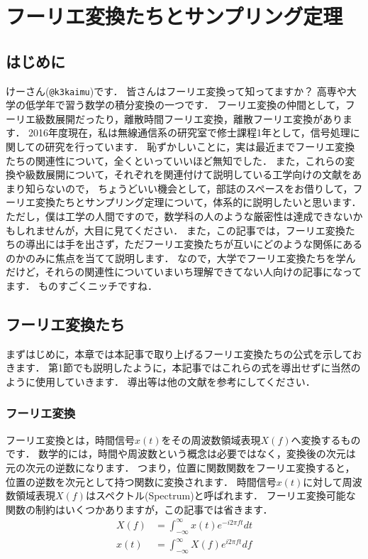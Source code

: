 
\chapter{フーリエ変換たちとサンプリング定理}

\section{はじめに}

けーさん(\verb|@k3kaimu|)です．
皆さんはフーリエ変換って知ってますか？
高専や大学の低学年で習う数学の積分変換の一つです．
フーリエ変換の仲間として，フーリエ級数展開だったり，離散時間フーリエ変換，離散フーリエ変換があります．
2016年度現在，私は無線通信系の研究室で修士課程1年として，信号処理に関しての研究を行っています．
恥ずかしいことに，実は最近までフーリエ変換たちの関連性について，全くといっていいほど無知でした．
また，これらの変換や級数展開について，それぞれを関連付けて説明している工学向けの文献をあまり知らないので，
ちょうどいい機会として，部誌のスペースをお借りして，フーリエ変換たちとサンプリング定理について，体系的に説明したいと思います．
ただし，僕は工学の人間ですので，数学科の人のような厳密性は達成できないかもしれませんが，大目に見てください．
また，この記事では，フーリエ変換たちの導出には手を出さず，ただフーリエ変換たちが互いにどのような関係にあるのかのみに焦点を当てて説明します．
なので，大学でフーリエ変換たちを学んだけど，それらの関連性についていまいち理解できてない人向けの記事になってます．
ものすごくニッチですね．

\section{フーリエ変換たち}

まずはじめに，本章では本記事で取り上げるフーリエ変換たちの公式を示しておきます．
第1節でも説明したように，本記事ではこれらの式を導出せずに当然のように使用していきます．
導出等は他の文献を参考にしてください．

\subsection{フーリエ変換}

フーリエ変換とは，時間信号$x(t)$をその周波数領域表現$X(f)$へ変換するものです．
数学的には，時間や周波数という概念は必要ではなく，変換後の次元は元の次元の逆数になります．
つまり，位置に関数関数をフーリエ変換すると，位置の逆数を次元として持つ関数に変換されます．
時間信号$x(t)$に対して周波数領域表現$X(f)$はスペクトル(Spectrum)と呼ばれます．
フーリエ変換可能な関数の制約はいくつかありますが，この記事では省きます．
\begin{align}
X(f) &= \int_{-\infty}^{\infty} x(t) e^{-i2\pi f t} dt \\
x(t) &= \int_{-\infty}^{\infty} X(f) e^{i2\pi ft} df
\end{align}

